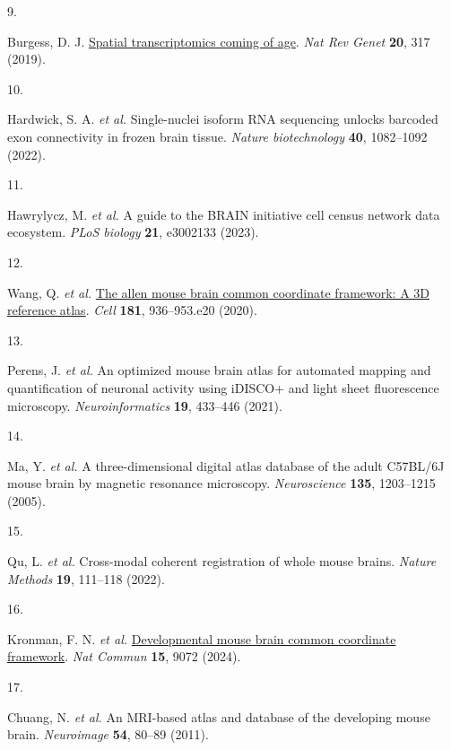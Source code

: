 \documentclass[
  12pt,
]{article}
\newlength{\cslhangindent}
\newlength{\csllabelwidth}
\newenvironment{CSLReferences}[2] %
 {\begin{list}{}{%
  \setlength{\itemindent}{0pt}
  \setlength{\leftmargin}{0pt}
  \setlength{\parsep}{0pt}
  \ifodd #1
   \setlength{\leftmargin}{\cslhangindent}
   \setlength{\itemindent}{-1\cslhangindent}
  \fi
  \setlength{\itemsep}{#2\baselineskip}}}
 {\end{list}}
\newcommand{\CSLLeftMargin}[1]{\parbox[t]{\csllabelwidth}{\strut#1\strut}}
\newcommand{\CSLRightInline}[1]{\parbox[t]{\linewidth - \csllabelwidth}{\strut#1\strut}}
\begin{document}
\begin{CSLReferences}{0}{0}
\CSLLeftMargin{9. }%
\CSLRightInline{Burgess, D. J.
\href{https://doi.org/10.1038/s41576-019-0129-z}{Spatial transcriptomics
coming of age}. \emph{Nat Rev Genet} \textbf{20}, 317 (2019).}

\CSLLeftMargin{10. }%
\CSLRightInline{Hardwick, S. A. \emph{et al.} Single-nuclei isoform RNA
sequencing unlocks barcoded exon connectivity in frozen brain tissue.
\emph{Nature biotechnology} \textbf{40}, 1082--1092 (2022).}

\CSLLeftMargin{11. }%
\CSLRightInline{Hawrylycz, M. \emph{et al.} A guide to the BRAIN
initiative cell census network data ecosystem. \emph{PLoS biology}
\textbf{21}, e3002133 (2023).}

\CSLLeftMargin{12. }%
\CSLRightInline{Wang, Q. \emph{et al.}
\href{https://doi.org/10.1016/j.cell.2020.04.007}{The allen mouse brain
common coordinate framework: A 3D reference atlas}. \emph{Cell}
\textbf{181}, 936--953.e20 (2020).}

\CSLLeftMargin{13. }%
\CSLRightInline{Perens, J. \emph{et al.} An optimized mouse brain atlas
for automated mapping and quantification of neuronal activity using
iDISCO+ and light sheet fluorescence microscopy. \emph{Neuroinformatics}
\textbf{19}, 433--446 (2021).}

\CSLLeftMargin{14. }%
\CSLRightInline{Ma, Y. \emph{et al.} A three-dimensional digital atlas
database of the adult C57BL/6J mouse brain by magnetic resonance
microscopy. \emph{Neuroscience} \textbf{135}, 1203--1215 (2005).}

\CSLLeftMargin{15. }%
\CSLRightInline{Qu, L. \emph{et al.} Cross-modal coherent registration
of whole mouse brains. \emph{Nature Methods} \textbf{19}, 111--118
(2022).}

\CSLLeftMargin{16. }%
\CSLRightInline{Kronman, F. N. \emph{et al.}
\href{https://doi.org/10.1038/s41467-024-53254-w}{Developmental mouse
brain common coordinate framework}. \emph{Nat Commun} \textbf{15}, 9072
(2024).}

\CSLLeftMargin{17. }%
\CSLRightInline{Chuang, N. \emph{et al.} An MRI-based atlas and database
of the developing mouse brain. \emph{Neuroimage} \textbf{54}, 80--89
(2011).}


\end{CSLReferences}
\end{document}
